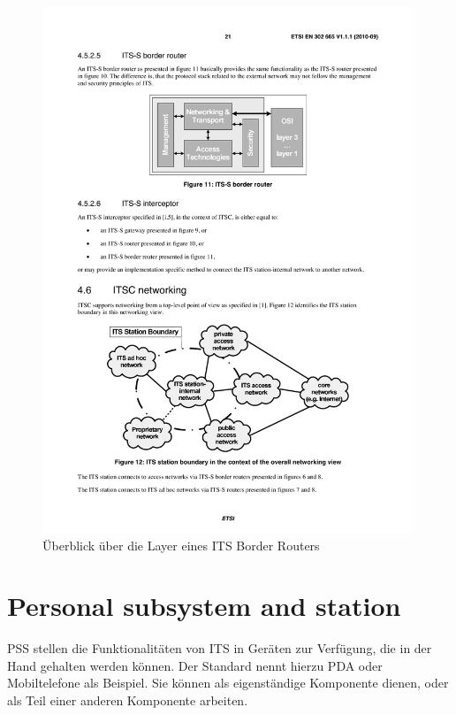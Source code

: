   
\begin{figure}
	\includegraphics[width=0.99\textwidth]{content/images/01_funktionsweise/layer_borderRouter.pdf}
	\caption{Überblick über die Layer eines ITS Border Routers \cite{etsi2010302}}
	\label{fig:funktionsweise_borderRouter}
\end{figure}



\section{Personal subsystem and station}
\ac{PSS} stellen die Funktionalitäten von \ac{ITS} in Geräten zur Verfügung, die in der Hand gehalten werden können. Der Standard nennt hierzu \ac{PDA} oder Mobiltelefone als Beispiel. Sie können als eigenständige Komponente dienen, oder als Teil einer anderen Komponente arbeiten.

